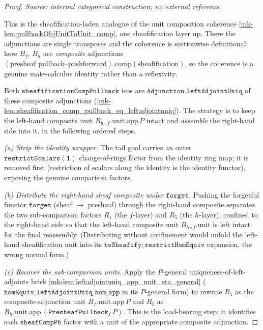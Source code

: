 \begin{proof}
  \textit{Source: internal categorical construction; no external reference.}

  This is the sheafification-laden analogue of the unit composition coherence
  \ref{mk-lem:pullbackObjUnitToUnit_comp}, one sheafification layer up. There the adjunctions
  are single transposes and the coherence is sectionwise definitional; here \(B_f\), \(B_h\)
  are \emph{composite} adjunctions \((\text{presheaf pullback--pushforward})\mathbin{.\mathrm{comp}}
  (\text{sheafification})\), so the coherence is a genuine mate-calculus identity rather than a
  reflexivity.

  Both \(\mathtt{sheafificationCompPullback}\) isos are
  \(\mathtt{Adjunction.leftAdjointUniq}\) of these composite adjunctions
  (\ref{mk-lem:sheafification_comp_pullback_eq_leftadjointuniq}). The strategy is to keep the
  left-hand composite unit \(B_{h \circ f}.\mathrm{unit}.\mathrm{app}\,P\) intact and
  \emph{assemble} the right-hand side into it, in the following ordered steps.

  \emph{(a) Strip the identity wrapper.} The tail goal carries an outer
  \(\mathtt{restrictScalars}(\mathbf{1})\) change-of-rings factor from the identity ring map;
  it is removed first (restriction of scalars along the identity is the identity functor),
  exposing the genuine comparison factors.

  \emph{(b) Distribute the right-hand sheaf composite under \(\mathtt{forget}\).} Pushing the
  forgetful functor \(\mathtt{forget}\) (sheaf \(\to\) presheaf) through the right-hand
  composite separates the two sub-comparison factors \(R_1\) (the \(f\)-layer) and \(R_5\)
  (the \(h\)-layer), confined to the right-hand side so that the left-hand composite unit
  \(B_{h \circ f}.\mathrm{unit}\) is left intact for the final reassembly. (Distributing
  without confinement would unfold the left-hand sheafification unit into its
  \(\mathtt{toSheafify} \mathbin{;} \mathtt{restrictHomEquiv}\) expansion, the wrong normal
  form.)

  \emph{(c) Recover the sub-comparison units.} Apply the \(P\)-general
  uniqueness-of-left-adjoints brick \ref{mk-lem:leftadjointuniq_app_unit_eta_general}
  (\(\mathtt{homEquiv\_leftAdjointUniq\_hom\_app}\) in its \(P\)-general form) to rewrite
  \(R_1\) as the composite-adjunction unit \(B_f.\mathrm{unit}.\mathrm{app}\,P\) and \(R_5\)
  as \(B_h.\mathrm{unit}.\mathrm{app}\,(\mathtt{PresheafPullback}_f\,P)\). This is the
  load-bearing step: it identifies each \(\mathtt{sheafCompPb}\) factor with a unit of the
  appropriate composite adjunction.


\end{proof}
